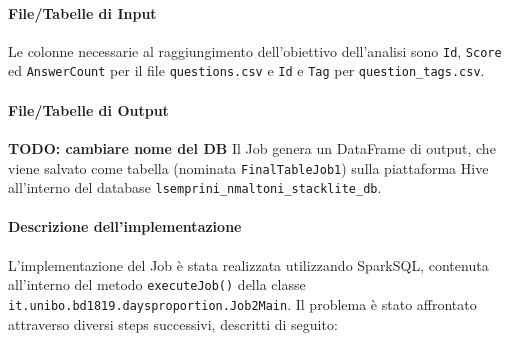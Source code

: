   \paragraph{File/Tabelle di Input}\label{par:job2:spark:input}

  Le colonne necessarie al raggiungimento dell'obiettivo dell'analisi sono \texttt{Id}, \texttt{Score}
  ed \texttt{AnswerCount} per il file \texttt{questions.csv} e \texttt{Id} e \texttt{Tag} per \texttt{question\_tags.csv}.

  \paragraph{File/Tabelle di Output}\label{par:job2:spark:output}
\textbf{TODO: cambiare nome del DB}
  Il Job genera un DataFrame di output, che viene salvato come tabella (nominata \texttt{FinalTableJob1})
  sulla piattaforma Hive all'interno del database \texttt{lsemprini\_nmaltoni\_stacklite\_db}.


  \paragraph{Descrizione dell'implementazione}\label{par:job2:spark:implementation}

  L'implementazione del Job è stata realizzata utilizzando SparkSQL, contenuta all'interno del metodo \texttt{executeJob()}
  della classe \texttt{it.unibo.bd1819.daysproportion.Job2Main}.
  Il problema è stato affrontato attraverso diversi steps successivi, descritti di seguito:


